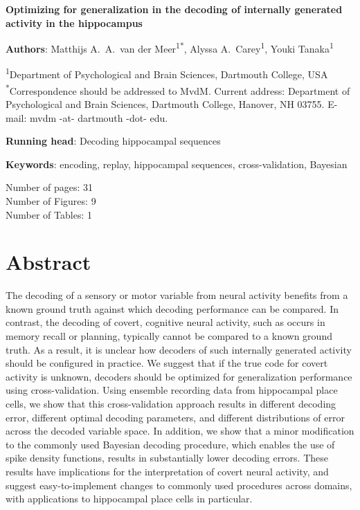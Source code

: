 \documentclass[11pt]{article}
\begin{document}

{\Large\bf Optimizing for generalization in the decoding of internally
  generated activity in the hippocampus}

{\bf Authors}: Matthijs A.\ A.\ van der Meer\textsuperscript{1*},
Alyssa A.\ Carey\textsuperscript{1}, Youki Tanaka\textsuperscript{1}

\textsuperscript{1}Department of Psychological and Brain Sciences,
Dartmouth College, USA\\

\textsuperscript{*}Correspondence should be addressed to MvdM. Current
address: Department of Psychological and Brain Sciences, Dartmouth
College, Hanover, NH 03755. E-mail: {\sffamily mvdm -at- dartmouth -dot- edu}.

{\bf Running head}: Decoding hippocampal sequences

{\bf Keywords}: encoding, replay, hippocampal sequences,
cross-validation, Bayesian

Number of pages: 31\\
Number of Figures: 9\\
Number of Tables: 1\\

\linenumbers

\newpage

\section*{Abstract}

The decoding of a sensory or motor variable from neural activity
benefits from a known ground truth against which decoding performance
can be compared. In contrast, the decoding of covert, cognitive neural
activity, such as occurs in memory recall or planning, typically
cannot be compared to a known ground truth. As a result, it is unclear
how decoders of such internally generated activity should be
configured in practice. We suggest that if the true code for covert
activity is unknown, decoders should be optimized for generalization
performance using cross-validation. Using ensemble recording data from
hippocampal place cells, we show that this cross-validation approach
results in different decoding error, different optimal decoding
parameters, and different distributions of error across the decoded
variable space. In addition, we show that a minor modification to the
commonly used Bayesian decoding procedure, which enables the use of
spike density functions, results in substantially lower decoding
errors. These results have implications for the interpretation of
covert neural activity, and suggest easy-to-implement changes to
commonly used procedures across domains, with applications to
hippocampal place cells in particular.
\end{document}
